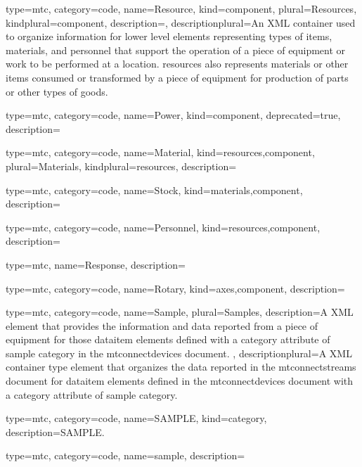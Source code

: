 {
  type=mtc,
  category=code,
  name={Resource},
  kind={component},
  plural={Resources},
  kindplural={component},
  description={},
  descriptionplural={An XML container used to organize information for \gls{lower level} elements representing types of items, materials, and personnel that support the operation of a piece of equipment or work to be performed at a location. \glspl{resource} also represents materials or other items consumed or transformed by a piece of equipment for production of parts or other types of goods.}
}


{
  type=mtc,
  category=code,
  name={Power},
  kind={component},
  deprecated={true},
  description={}
}


{
  type=mtc,
  category=code,
  name={Material},
  kind={resources,component},
  plural={Materials},
  kindplural={resources},
  description={}
}


{
  type=mtc,
  category=code,
  name={Stock},
  kind={materials,component},
  description={}
}


{
  type=mtc,
  category=code,
  name={Personnel},
  kind={resources,component},
  description={}
}


{
  type=mtc,
  name={Response},
  description={}
}



{
  type=mtc,
  category=code,
  name={Rotary},
  kind={axes,component},
  description={}
}


{
  type=mtc,
  category=code,
  name={Sample},
  plural={Samples},
  description={A XML element that provides the information and data reported from a piece of equipment for those \gls{dataitem} elements defined with a \gls{category} attribute of \gls{sample category} in the \glspl{mtconnectdevice} document. },
  descriptionplural={A XML container type element that organizes the data reported in the \glspl{mtconnectstream} document for \gls{dataitem} elements defined in the \glspl{mtconnectdevice} document with a \gls{category} attribute of \gls{sample category}.}
}


{
  type=mtc,
  category=code,
  name={SAMPLE},
  kind={category},
  description={SAMPLE.}
}


{
  type=mtc,
  category=code,
  name={sample},
  description={}
}


